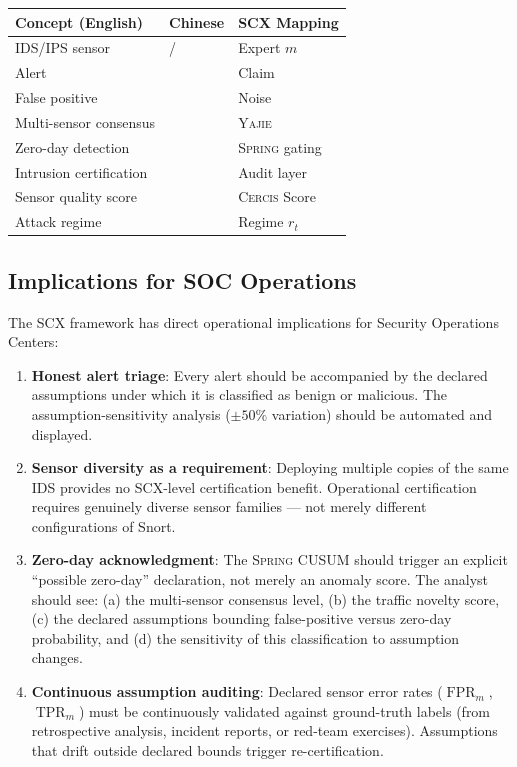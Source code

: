 \documentclass[11pt,a4paper]{article}
\theoremstyle{definition}
\theoremstyle{remark}
\newcommand{\Yajie}{\textsc{Yajie}}
\newcommand{\Cercis}{\textsc{Cercis}}
\newcommand{\Spring}{\textsc{Spring}}
\DeclareMathOperator{\TPR}{TPR}
\DeclareMathOperator{\FPR}{FPR}
\begin{document}
\begin{center}
\begin{tabular}{lll}
\toprule
\textbf{Concept (English)} & \textbf{Chinese} & \textbf{SCX Mapping} \\
\midrule
IDS/IPS sensor & / & Expert $m$ \\
Alert &  & Claim \\
False positive &  & Noise \\
Multi-sensor consensus &  & \Yajie{} \\
Zero-day detection &  & \Spring{} gating \\
Intrusion certification &  & Audit layer \\
Sensor quality score &  & \Cercis{} Score \\
Attack regime &  & Regime $r_t$ \\
\bottomrule
\end{tabular}
\end{center}

\subsection{Implications for SOC Operations }

The SCX framework has direct operational implications for Security Operations Centers:

\begin{enumerate}[label=(\roman*)]
    \item \textbf{Honest alert triage}: Every alert should be accompanied by the declared assumptions under which it is classified as benign or malicious. The assumption-sensitivity analysis ($\pm 50\%$ variation) should be automated and displayed.
    \item \textbf{Sensor diversity as a requirement}: Deploying multiple copies of the same IDS provides no SCX-level certification benefit. Operational certification requires genuinely diverse sensor families — not merely different configurations of Snort.
    \item \textbf{Zero-day acknowledgment}: The \Spring{} CUSUM should trigger an explicit ``possible zero-day'' declaration, not merely an anomaly score. The analyst should see: (a) the multi-sensor consensus level, (b) the traffic novelty score, (c) the declared assumptions bounding false-positive versus zero-day probability, and (d) the sensitivity of this classification to assumption changes.
    \item \textbf{Continuous assumption auditing}: Declared sensor error rates ($\FPR_m$, $\TPR_m$) must be continuously validated against ground-truth labels (from retrospective analysis, incident reports, or red-team exercises). Assumptions that drift outside declared bounds trigger re-certification.
\end{enumerate}
\end{document}
